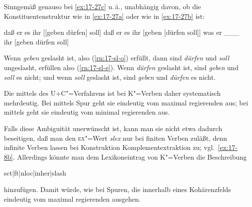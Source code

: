 \documentclass[output=paper]{LSP/langsci}
\begin{document}
\addlines[2]
\randnum\label{rn:17-79}Sinngemäß genauso bei \eqref{ex:17-27c} u.\,ä., unabhängig davon, ob die
Konstituentenstruktur wie in \eqref{ex:17-27a} oder wie in \eqref{ex:17-27b} ist:
\begin{exe}
\ex
\label{ex:17-27}
\begin{xlist}
\ex
\label{ex:17-27a}
daß er es ihr [[geben dürfen] soll]
\ex
\label{ex:17-27b}
daß er es ihr [geben [dürfen soll]]
\ex
\label{ex:17-27c}
was er \_\_\_ ihr [geben dürfen soll]
\end{xlist}
\end{exe}
Wenn \textit{geben} geslasht ist, also (\ref{rn:17-sl-o}) erfüllt, dann sind
\textit{dürfen} und \textit{soll} ungeslasht, erfüllen also (\ref{rn:17-sl-e}). Wenn
\textit{dürfen} geslasht ist, sind \textit{geben} und \textit{soll}
es nicht; und wenn \textit{soll} geslasht ist, sind \textit{geben}
und \textit{dürfen} es nicht.

\randnum\label{rn:17-80}Die  mittels des U+C"=Verfahrens ist bei K"=Verben daher
systematisch mehrdeutig. Bei  mittels Spur geht sie
eindeutig vom maximal regierenden  aus; bei  mittels
 geht sie eindeutig vom minimal regierenden  aus.

\randnum\label{rn:17-81}Falls diese Ambiguität unerwünscht ist, kann man sie nicht
etwa dadurch beseitigen, daß man den \textsc{ex}"=Wert \textit{slex}
nur bei finiten Verben zuläßt, denn infinite Verben lassen bei
 Konstruktion Komplementextraktion zu;
vgl.\ \eqref{ex:17-8b}. Allerdings könnte man dem Lexikoneintrag von K"=Verben die
Beschreibung
\begin{exe}
\ex
\begin{avm}
\avml
sct|ft|nloc|inher|slash 
\avmr
\end{avm}
\end{exe}
hinzufügen. Damit würde, wie bei Spuren, die  innerhalb
eines Kohärenzfelds eindeutig vom maximal regierenden  ausgehen.
\end{document}
